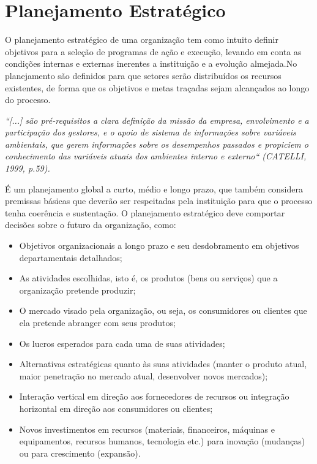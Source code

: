 \documentclass[12pt,a4paper,ruledheader,tocpage=prefix,floatnumber=continuous,pagestart=folhaderosto,font=times]{abnt}
\begin{document}
\section{Planejamento Estratégico}
O planejamento estratégico de uma organização tem como intuito definir objetivos para a seleção de programas de ação e execução, levando em conta as 
condições internas e externas inerentes a instituição e a evolução almejada.No planejamento são definidos para que setores serão distribuídos os recursos 
existentes, de forma que os objetivos e metas traçadas sejam alcançados ao longo do processo. 

\begin{flushright}
 \hfill \textit{``[...] são pré-requisitos a clara definição da missão da empresa, envolvimento e a participação dos gestores, e o apoio de sistema de 
informações sobre variáveis ambientais, que gerem informações sobre os desempenhos passados e propiciem o conhecimento das variáveis atuais dos 
ambientes interno e externo`` (CATELLI, 1999, p.59).}
\end{flushright}

É um planejamento global a curto, médio e longo prazo, que também  considera premissas básicas que deverão ser respeitadas pela instituição para que o 
processo tenha coerência e sustentação. O planejamento estratégico deve comportar decisões sobre o futuro da organização, como:\cite{rodolfo} 

\begin{itemize}	
\item Objetivos organizacionais a longo prazo e seu desdobramento em objetivos departamentais detalhados; 
\item As atividades escolhidas, isto é, os produtos (bens ou serviços) que a organização pretende produzir;
\item O mercado visado pela organização, ou seja, os consumidores ou clientes que ela pretende abranger com seus produtos;
\item Os lucros esperados para cada uma de suas atividades;
\item Alternativas estratégicas quanto às suas atividades (manter o produto atual, maior penetração no mercado atual, desenvolver novos mercados);
\item Interação vertical em direção aos fornecedores de recursos ou integração horizontal em direção aos consumidores ou clientes;
\item Novos investimentos em recursos (materiais, financeiros, máquinas e equipamentos, recursos humanos, tecnologia etc.) para inovação (mudanças) ou para crescimento (expansão).
\end{itemize}
\end{document}
